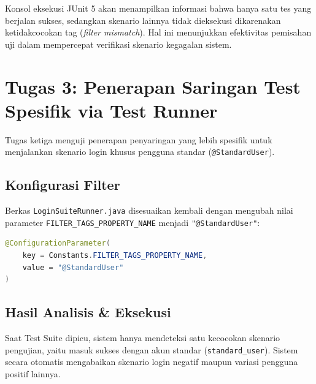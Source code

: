 \documentclass[a4paper,oneside,11pt]{book}
\begin{document}


Konsol eksekusi JUnit 5 akan menampilkan informasi bahwa hanya satu tes yang berjalan sukses, sedangkan skenario lainnya tidak dieksekusi dikarenakan ketidakcocokan tag (\textit{filter mismatch}). Hal ini menunjukkan efektivitas pemisahan uji dalam mempercepat verifikasi skenario kegagalan sistem.

\section{Tugas 3: Penerapan Saringan Test Spesifik via Test Runner}
Tugas ketiga menguji penerapan penyaringan yang lebih spesifik untuk menjalankan skenario login khusus pengguna standar (\texttt{@StandardUser}).

\subsection{Konfigurasi Filter}
Berkas \texttt{LoginSuiteRunner.java} disesuaikan kembali dengan mengubah nilai parameter \texttt{FILTER\_TAGS\_PROPERTY\_NAME} menjadi \texttt{"@StandardUser"}:

\begin{lstlisting}[language=Java, caption=Potongan Konfigurasi Filter Tag @StandardUser]
@ConfigurationParameter(
    key = Constants.FILTER_TAGS_PROPERTY_NAME, 
    value = "@StandardUser"
)
\end{lstlisting}

\subsection{Hasil Analisis \& Eksekusi}
Saat Test Suite dipicu, sistem hanya mendeteksi satu kecocokan skenario pengujian, yaitu masuk sukses dengan akun standar (\texttt{standard\_user}). Sistem secara otomatis mengabaikan skenario login negatif maupun variasi pengguna positif lainnya.
\end{document}

